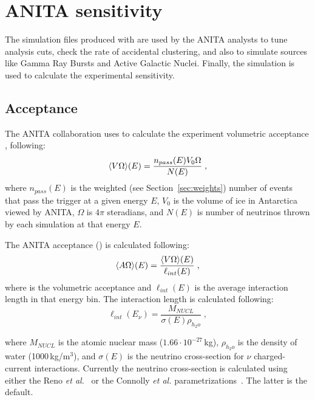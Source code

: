 \section{ANITA sensitivity}
\label{sec:results}

The simulation files produced with \icemc are used by the ANITA analysts to tune analysis cuts, check the rate of accidental clustering, and also to simulate sources like Gamma Ray Bursts and Active Galactic Nuclei.
Finally, the simulation is used to calculate the experimental sensitivity.

\subsection{Acceptance}
\label{subsec:acceptance}
The ANITA collaboration uses \icemc to calculate the experiment volumetric acceptance \effvol, following:
\begin{equation}
  \label{eq:volacceptance}
  \langle V\Omega\rangle(E) = \dfrac{n_{{pass}}(E)V_0\Omega}{N(E)} \;,
\end{equation}
\noindent where
 $n_{{pass}}(E)$ is the weighted (see Section~\ref{sec:weights}) number of events that pass the trigger at a given energy $E$,
 $V_0$ is the volume of ice in Antarctica viewed by ANITA,
$\Omega$ is $4\pi$ steradians, and 
 $N(E)$ is number of neutrinos thrown by each simulation at that energy $E$.

The ANITA acceptance (\effarea) is calculated following:
\begin{equation}
  \label{eq:acceptance}
  \langle A\Omega\rangle(E) = \dfrac{\langle V\Omega\rangle(E)}{\ell_{{int}}(E)} \;,
\end{equation}
\noindent where
 \effvol is the volumetric acceptance and
 $\ell_{{int}}(E)$ is the average interaction length in that energy bin. %
The interaction length is calculated following:
 \begin{equation}
   \label{eq:intlength}
    \ell_{{int}}(E_\nu) =   \dfrac{M_{NUCL}}{\sigma(E) \rho_{h_2o} } \;,
  \end{equation}
  
\noindent where
 $M_{NUCL}$ is the atomic nuclear mass ($1.66\cdot 10^{-27}$\,kg),
 $\rho_{h_2o}$ is the density of water (1000\,kg/m$^3$), 
and $\sigma(E)$ is the neutrino cross-section for $\nu$ charged-current interactions.
Currently the neutrino cross-section is calculated using either the
Reno {\it et al.}~\cite{reno2005high}
or the Connolly {\it et al.} parametrizations~\cite{PhysRevD.83.113009}.
The latter is the default.


